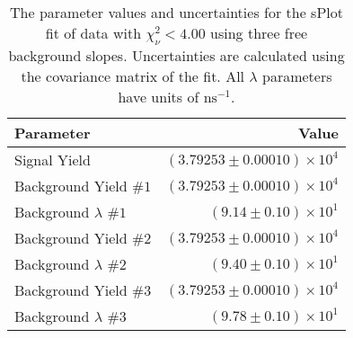 
\begin{table}[h]
    \begin{center}
        \begin{tabular}{lr}\toprule
            Parameter & Value \\\midrule
            Signal Yield & $(3.79253 \pm 0.00010) \times 10^{4}$ \\
            Background Yield $\#1$ & $(3.79253 \pm 0.00010) \times 10^{4}$ \\
            Background $\lambda$ $\#1$ & $(9.14 \pm 0.10) \times 10^{1}$ \\
            Background Yield $\#2$ & $(3.79253 \pm 0.00010) \times 10^{4}$ \\
            Background $\lambda$ $\#2$ & $(9.40 \pm 0.10) \times 10^{1}$ \\
            Background Yield $\#3$ & $(3.79253 \pm 0.00010) \times 10^{4}$ \\
            Background $\lambda$ $\#3$ & $(9.78 \pm 0.10) \times 10^{1}$ \\\bottomrule
        \end{tabular}
        \caption{The parameter values and uncertainties for the sPlot fit of data with $\chi^2_\nu < 4.00$ using three free background slopes. Uncertainties are calculated using the covariance matrix of the fit. All $\lambda$ parameters have units of $\si{\nano\second}^{-1}$.}
    \end{center}
\end{table}
